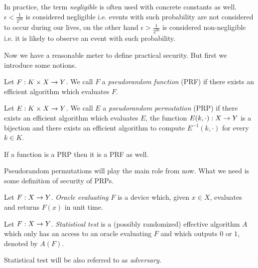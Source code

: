 \begin{note}
\label{note:neglconst}
	In practice, the term {\em negligible} is often used with concrete constants as well. $\epsilon<\frac{1}{2^{80}}$ is considered negligible i.e. events with such probability are not considered to occur during our lives, on the other hand $\epsilon>\frac{1}{2^{30}}$ is considered non-negligible i.e. it is likely to observe an event with such probability.
\end{note}

Now we have a reasonable meter to define practical security. But first we introduce some notions.

\begin{defn}   %
	Let $F: K\times X\rightarrow Y$. We call $F$ a {\em pseudorandom function} (PRF) if there exists an efficient algorithm which evaluates $F$.
\end{defn}

\begin{defn}
	Let $E: K\times X\rightarrow Y$. We call $E$ a {\em pseudorandom permutation} (PRP) if there exists an efficient algorithm which evaluates $E$, the function $E(k,\cdot): X\rightarrow Y$ is a bijection and there exists an efficient algorithm to compute $E^{-1}(k,\cdot)$ for every $k\in K$.
\end{defn}

\begin{note}
	If a function is a PRP then it is a PRF as well.
\end{note}

Pseudorandom permutations will play the main role from now. What we need is some definition of security of PRPs.

\begin{defn}[Oracle]
	Let $F:X\rightarrow Y$. {\em Oracle evaluating $F$} is a device which, given $x\in X$, evaluates and returns $F(x)$ in unit time.
\end{defn}

\begin{defn}   %
	Let $F:X\rightarrow Y$. {\em Statistical test} is a (possibly randomized) effective algorithm $A$ which only has an access to an oracle evaluating $F$ and which outputs $0$ or $1$, denoted by $A(F)$.
\end{defn}

\begin{note}
	Statistical test will be also referred to as {\em adversary}.
\end{note}

